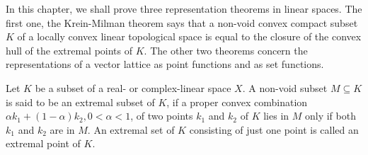 \label{chap:XII}

In this chapter, we shall prove three representation theorems in linear spaces. The first one, the Krein-Milman theorem says that a non-void convex compact subset $K$ of a locally convex linear topological space is equal to the closure of the convex hull of the extremal points of $K$. The other two theorems concern the representations of a vector lattice as point functions and as set functions. 


\label{sec:XII.1}

\begin{definitionu} Let $K$ be a subset of a real- or complex-linear space $X$. A non-void subset $M \subseteq K$ is said to be an extremal subset of $K$, if a proper convex combination $\alpha k_{1} + (1 - \alpha) k_{2}, 0 < \alpha < 1$, of two points $k_{1}$ and $k_{2}$ of $K$ lies in $M$ only if both $k_{1}$ and $k_{2}$ are in $M$. An extremal set of $K$ consisting of just one point is called an extremal point of $K$. 
\end{definitionu}

